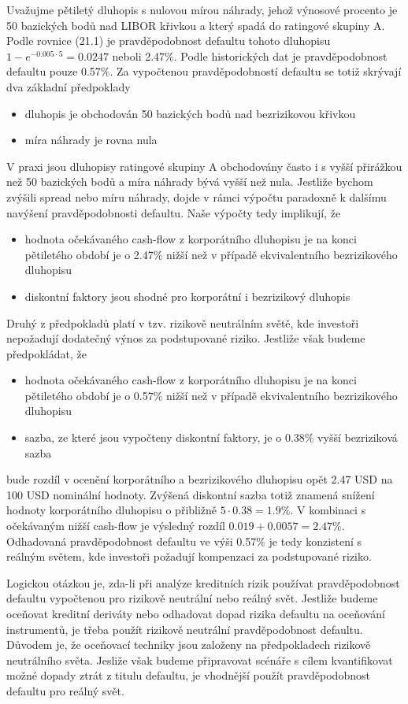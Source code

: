 \documentclass[a4paper]{book}
\begin{document}
Uvažujme pětiletý dluhopis s nulovou mírou náhrady, jehož výnosové procento je 50 bazických bodů nad LIBOR křivkou a který spadá do ratingové skupiny A. Podle rovnice (21.1) je pravděpodobnost defaultu tohoto dluhopisu $1-e^{-0.005 \cdot 5} = 0.0247$ neboli 2.47\%. Podle historických dat je pravděpodobnost defaultu pouze 0.57\%. Za vypočtenou pravděpodobností defaultu se totiž skrývají dva základní předpoklady
\begin{itemize}
\item dluhopis je obchodován 50 bazických bodů nad bezrizikovou křivkou
\item míra náhrady je rovna nula
\end{itemize}
V praxi jsou dluhopisy ratingové skupiny A obchodovány často i s vyšší přirážkou než 50 bazických bodů a míra náhrady bývá vyšší než nula. Jestliže bychom zvýšili spread nebo míru náhrady, dojde v rámci výpočtu paradoxně k dalšímu navýšení pravděpodobnosti defaultu. Naše výpočty tedy implikují, že
\begin{itemize}
\item hodnota očekávaného cash-flow z korporátního dluhopisu je na konci pětiletého období je o 2.47\% nižší než v případě ekvivalentního bezrizikového dluhopisu
\item diskontní faktory jsou shodné pro korporátní i bezrizikový dluhopis  
\end{itemize}
Druhý z předpokladů platí v tzv. rizikově neutrálním světě, kde investoři nepožadují dodatečný výnos za podstupované riziko. Jestliže však budeme předpokládat, že
\begin{itemize}
\item hodnota očekávaného cash-flow z korporátního dluhopisu je na konci pětiletého období je o 0.57\% nižší než v případě ekvivalentního bezrizikového dluhopisu
\item sazba, ze které jsou vypočteny diskontní faktory, je o 0.38\% vyšší bezriziková sazba  
\end{itemize}
bude rozdíl v ocenění korporátního a bezrizikového dluhopisu opět 2.47 USD na 100 USD nominální hodnoty. Zvýšená diskontní sazba totiž znamená snížení hodnoty korporátního dluhopisu o přibližně $5 \cdot 0.38 = 1.9\%$. V kombinaci s očekávaným nižší cash-flow je výsledný rozdíl $0.019 + 0.0057 = 2.47\%$. Odhadovaná pravděpodobnost defaultu ve výši 0.57\% je tedy konzistení s reálným světem, kde investoři požadují kompenzaci za podstupované riziko.

Logickou otázkou je, zda-li při analýze kreditních rizik používat pravděpodobnost defaultu vypočtenou pro rizikově neutrální nebo reálný svět. Jestliže budeme oceňovat kreditní deriváty nebo odhadovat dopad rizika defaultu na oceňování instrumentů, je třeba použít rizikově neutrální pravděpodobnost defaultu. Důvodem je, že oceňovací techniky jsou založeny na předpokladech rizikově neutrálního světa. Jesliže však budeme připravovat scénáře s cílem kvantifikovat možné dopady ztrát z titulu defaultu, je vhodnější použít pravděpodobnost defaultu pro reálný svět.
\end{document}
